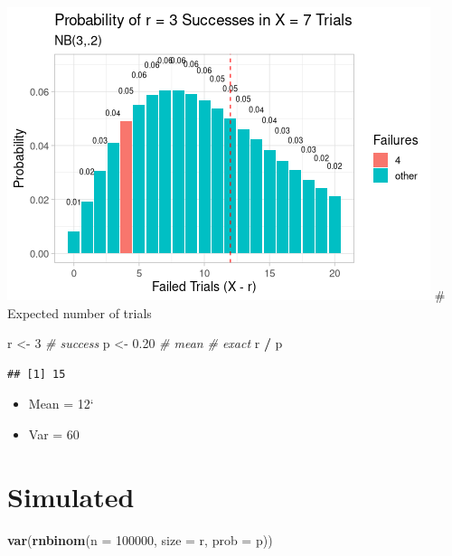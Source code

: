 \documentclass[
  10pt,
]{article}
\newenvironment{Shaded}{\begin{snugshade}}{\end{snugshade}}
\newcommand{\AttributeTok}[1]{\textcolor[rgb]{0.13,0.29,0.53}{#1}}
\newcommand{\CommentTok}[1]{\textcolor[rgb]{0.56,0.35,0.01}{\textit{#1}}}
\newcommand{\DecValTok}[1]{\textcolor[rgb]{0.00,0.00,0.81}{#1}}
\newcommand{\FloatTok}[1]{\textcolor[rgb]{0.00,0.00,0.81}{#1}}
\newcommand{\FunctionTok}[1]{\textcolor[rgb]{0.13,0.29,0.53}{\textbf{#1}}}
\newcommand{\NormalTok}[1]{#1}
\newcommand{\OtherTok}[1]{\textcolor[rgb]{0.56,0.35,0.01}{#1}}
\newcommand{\SpecialCharTok}[1]{\textcolor[rgb]{0.81,0.36,0.00}{\textbf{#1}}}
\providecommand{\tightlist}{%
  \setlength{\itemsep}{0pt}\setlength{\parskip}{0pt}}
\begin{document}
\includegraphics{06.negative_binomial_files/figure-latex/unnamed-chunk-4-1.png}
\# Expected number of trials

\begin{Shaded}
\begin{Highlighting}[]
\NormalTok{r }\OtherTok{\textless{}{-}}  \DecValTok{3} \CommentTok{\# success}
\NormalTok{p }\OtherTok{\textless{}{-}}  \FloatTok{0.20}
\CommentTok{\# mean}
\CommentTok{\# exact}
\NormalTok{r }\SpecialCharTok{/}\NormalTok{ p}
\end{Highlighting}
\end{Shaded}

\begin{verbatim}
## [1] 15
\end{verbatim}

\begin{itemize}
\tightlist
\item
  Mean = 12`
\item
  Var = 60
\end{itemize}

\hypertarget{simulated}{%
\section{Simulated}\label{simulated}}

\begin{Shaded}
\begin{Highlighting}[]
\FunctionTok{var}\NormalTok{(}\FunctionTok{rnbinom}\NormalTok{(}\AttributeTok{n =} \DecValTok{100000}\NormalTok{, }\AttributeTok{size =}\NormalTok{ r, }\AttributeTok{prob =}\NormalTok{ p))}
\end{Highlighting}
\end{Shaded}
\end{document}
